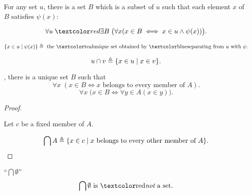 \begin{frame}{}
  \begin{axiom}
    For any set $u$, there is a set $B$
    which is a subset of $u$ such that each element $x$ of $B$ satisfies $\psi(x)$:

    \[
      \forall u\; \red{\exists B}\; \big( \forall x (x \in B \iff x \in u \land \psi(x)) \big).
    \]
  \end{axiom}

  \begin{definition}
    \[
      \set{x \in u \mid \psi(x)} \triangleq \text{ the \teal{unique} set obtained by \blue{separating} from } u \text{ with } \psi.
    \]
  \end{definition}

  \pause
  \begin{definition}[``$u \cap v$'']
    \[
      u \cap v \triangleq \{x \in u \mid x \in v\}.
    \]
  \end{definition}
\end{frame}

\begin{frame}{}
  \begin{theorem}
    , there is a unique set $B$ such that
    \[
      \forall x\; (x \in B \iff x \text{ belongs to every member of } A).
    \]
    \[
      \forall x\; \big(x \in B \iff \forall y \in A (x \in y) \big).
    \]
  \end{theorem}

  \pause
  \begin{proof}
    \begin{center}
      Let $c$ be a fixed member of $A$.
    \end{center}

    \pause
    \vspace{-0.50cm}
    \[
      \bigcap A \triangleq \{x \in c \mid x \text{ belongs to every other member of } A\}.
    \]
  \end{proof}

  \pause
  \begin{alertblock}{``$\bigcap \emptyset$''}
    \[
      \bigcap \emptyset \text{ is \red{\it not} a set}.
    \]
  \end{alertblock}
\end{frame}

